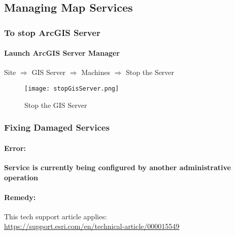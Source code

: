 %
%
%
%
% 
\subsection{Managing Map Services}
\medskip

\subsubsection[Stopping the GIS Server]{To stop ArcGIS Server}
\medskip

\paragraph*{Launch ArcGIS Server Manager\texorpdfstring{\\}{}}
\noindent Site $\Rightarrow$ GIS Server $\Rightarrow$ Machines $\Rightarrow$ Stop the Server
\begin{figure}[h!]
\centering
    \texttt{[image: stopGisServer.png]}
\caption{Stop the GIS Server}
\end{figure}
\clearpage
\subsubsection[Fixing Damaged Services]{Fixing Damaged Services\texorpdfstring{\\}{}}
\paragraph*{Error: \texorpdfstring{\\}{}}
\noindent \textbf{Service is currently being configured by another administrative operation}
\paragraph*{Remedy: \texorpdfstring{\\}{}}
\noindent This tech support article applies:\\
\href{https://support.esri.com/en/technical-article/000015549}{https://support.esri.com/en/technical-article/000015549}
\vspace{.25in}


